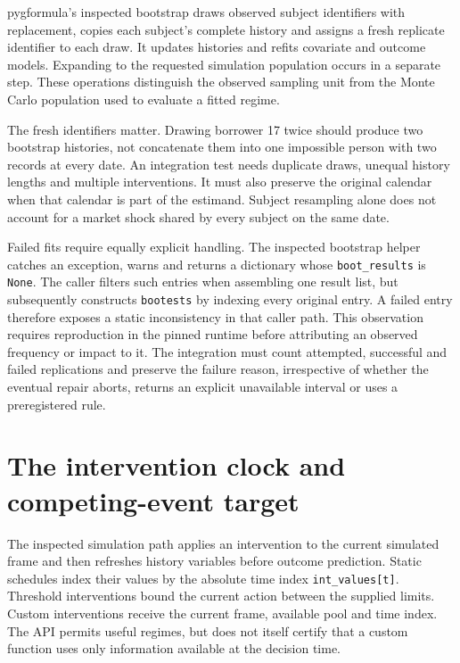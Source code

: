 pygformula's inspected bootstrap draws observed subject identifiers with
replacement, copies each subject's complete history and assigns a fresh replicate
identifier to each draw. It updates histories and refits covariate and outcome
models. Expanding to the requested simulation population occurs in a separate
step. These operations distinguish the observed sampling unit from the Monte
Carlo population used to evaluate a fitted regime. \cite{v131_sw_pygformula}

The fresh identifiers matter. Drawing borrower 17 twice should produce two
bootstrap histories, not concatenate them into one impossible person with two
records at every date. An integration test needs duplicate draws, unequal
history lengths and multiple interventions. It must also preserve the original
calendar when that calendar is part of the estimand. Subject resampling alone
does not account for a market shock shared by every subject on the same date.

Failed fits require equally explicit handling. The inspected bootstrap helper
catches an exception, warns and returns a dictionary whose
\texttt{boot\_results} is \texttt{None}. The caller filters such entries when
assembling one result list, but subsequently constructs \texttt{bootests} by
indexing every original entry. A failed entry therefore exposes a static
inconsistency in that caller path. This observation requires reproduction in
the pinned runtime before attributing an observed frequency or impact to it.
The integration must count attempted, successful and failed replications and
preserve the failure reason, irrespective of whether the eventual repair
aborts, returns an explicit unavailable interval or uses a preregistered rule.
\cite{v13_sw_pygformula,v131_sw_pygformula}

\section{The intervention clock and competing-event target}

The inspected simulation path applies an intervention to the current simulated
frame and then refreshes history variables before outcome prediction. Static
schedules index their values by the absolute time index \texttt{int\_values[t]}.
Threshold interventions bound the current action between the supplied limits.
Custom interventions receive the current frame, available pool and time index.
The API permits useful regimes, but does not itself certify that a custom
function uses only information available at the decision time.
\cite{v131_sw_pygformula}

